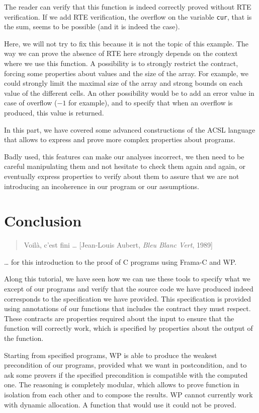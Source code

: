 \documentclass[12pt,francais,]{scrbook}
\begin{document}
The reader can verify that this function is indeed correctly proved
without RTE verification. If we add RTE verification, the overflow on
the variable \texttt{cur}, that is the sum, seems to be possible (and it
is indeed the case).

Here, we will not try to fix this because it is not the topic of this
example. The way we can prove the absence of RTE here strongly depends
on the context where we use this function. A possibility is to strongly
restrict the contract, forcing some properties about values and the size
of the array. For example, we could strongly limit the maximal size of
the array and strong bounds on each value of the different cells. An
other possibility would be to add an error value in case of overflow
(\(-1\) for example), and to specify that when an overflow is produced,
this value is returned.

In this part, we have covered some advanced constructions of the ACSL
language that allows to express and prove more complex properties about
programs.

Badly used, this features can make our analyses incorrect, we then need
to be careful manipulating them and not hesitate to check them again and
again, or eventually express properties to verify about them to assure
that we are not introducing an incoherence in our program or our
assumptions.

\chapter{Conclusion}\label{conclusion}

\begin{quote}
Voilà, c'est fini \ldots{} \hfill {[}Jean-Louis Aubert, \emph{Bleu Blanc
Vert}, 1989{]}
\end{quote}

\ldots{} for this introduction to the proof of C programs using Frama-C
and WP.

Along this tutorial, we have seen how we can use these tools to specify
what we except of our programs and verify that the source code we have
produced indeed corresponds to the specification we have provided. This
specification is provided using annotations of our functions that
includes the contract they must respect. These contracts are properties
required about the input to ensure that the function will correctly
work, which is specified by properties about the output of the function.

Starting from specified programs, WP is able to produce the weakest
precondition of our programs, provided what we want in postcondition,
and to ask some provers if the specified precondition is compatible with
the computed one. The reasoning is completely modular, which allows to
prove function in isolation from each other and to compose the results.
WP cannot currently work with dynamic allocation. A function that would
use it could not be proved.
\end{document}
